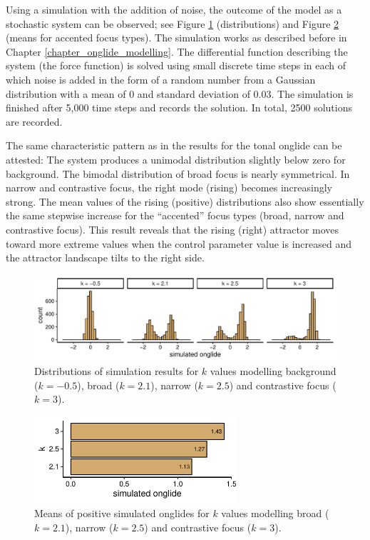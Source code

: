 Using a simulation with the addition of noise, the outcome of the model as a stochastic system can be observed; see Figure \ref{fig:simulation_bg_br_na_co} (distributions) and Figure \ref{fig:simulation_means_bg_br_na_co} (means for accented focus types). The simulation works as described before in Chapter \ref{chapter_onglide_modelling}. The differential function describing the system (the force function) is solved using small discrete time steps in each of which noise is added in the form of a random number from a Gaussian distribution with a mean of $0$ and standard deviation of $0.03$. The simulation is finished after 5,000 time steps and records the solution. In total, 2500 solutions are recorded.

The same characteristic pattern as in the results for the tonal onglide can be attested: The system produces a unimodal distribution slightly below zero for background. The bimodal distribution of broad focus is nearly symmetrical. In narrow and contrastive focus, the right mode (rising) becomes increasingly strong. The mean values of the rising (positive) distributions also show essentially the same stepwise increase for the “accented” focus types (broad, narrow and contrastive focus). This result reveals that the rising (right) attractor moves toward more extreme values when the control parameter value is increased and the attractor landscape tilts to the right side.

\begin{figure}[htbp]
\begin{center}
\includegraphics[width=\textwidth]{figures/ch7/onglide_all_across.pdf}
\caption{Distributions of simulation results for $k$ values modelling background ($k=-0.5$), broad ($k=2.1$), narrow ($k=2.5$) and contrastive focus ($k=3$).}
\label{fig:simulation_bg_br_na_co}
\end{center}
\end{figure}

\begin{figure}[htbp]
\begin{center}
\includegraphics[width=7.5cm]{figures/ch7/positive_means_across.pdf}
\caption{Means of positive simulated onglides for $k$ values modelling broad ($k=2.1$), narrow ($k=2.5$) and contrastive focus ($k=3$).}
\label{fig:simulation_means_bg_br_na_co}
\end{center}
\end{figure}

